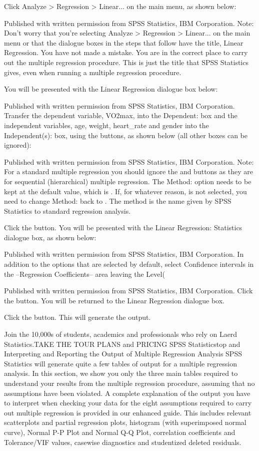 \documentclass[]{article}
\begin{document}
	Click Analyze > Regression > Linear... on the main menu, as shown below:
	
	
	Published with written permission from SPSS Statistics, IBM Corporation.
	Note: Don't worry that you're selecting Analyze > Regression > Linear... on the main menu or that the dialogue boxes in the steps that follow have the title, Linear Regression. You have not made a mistake. You are in the correct place to carry out the multiple regression procedure. This is just the title that SPSS Statistics gives, even when running a multiple regression procedure.
	
	You will be presented with the Linear Regression dialogue box below:
	
	
	Published with written permission from SPSS Statistics, IBM Corporation.
	Transfer the dependent variable, VO2max, into the Dependent: box and the independent variables, age, weight, heart\_rate and gender into the Independent(s): box, using the  buttons, as shown below (all other boxes can be ignored):
	
	
	Published with written permission from SPSS Statistics, IBM Corporation.
	Note: For a standard multiple regression you should ignore the  and  buttons as they are for sequential (hierarchical) multiple regression. The Method: option needs to be kept at the default value, which is . If, for whatever reason,  is not selected, you need to change Method: back to . The  method is the name given by SPSS Statistics to standard regression analysis.
	
	Click the  button. You will be presented with the Linear Regression: Statistics dialogue box, as shown below:
	
	
	Published with written permission from SPSS Statistics, IBM Corporation.
	In addition to the options that are selected by default, select Confidence intervals in the –Regression Coefficients– area leaving the Level(%
	
	
	Published with written permission from SPSS Statistics, IBM Corporation.
	Click the  button. You will be returned to the Linear Regression dialogue box.
	
	Click the  button. This will generate the output.
	
	Join the 10,000s of students, academics and professionals who rely on Laerd Statistics.TAKE THE TOUR PLANS and PRICING
	SPSS Statisticstop and
	Interpreting and Reporting the Output of Multiple Regression Analysis
	SPSS Statistics will generate quite a few tables of output for a multiple regression analysis. In this section, we show you only the three main tables required to understand your results from the multiple regression procedure, assuming that no assumptions have been violated. A complete explanation of the output you have to interpret when checking your data for the eight assumptions required to carry out multiple regression is provided in our enhanced guide. This includes relevant scatterplots and partial regression plots, histogram (with superimposed normal curve), Normal P-P Plot and Normal Q-Q Plot, correlation coefficients and Tolerance/VIF values, casewise diagnostics and studentized deleted residuals.
	
\end{document}
